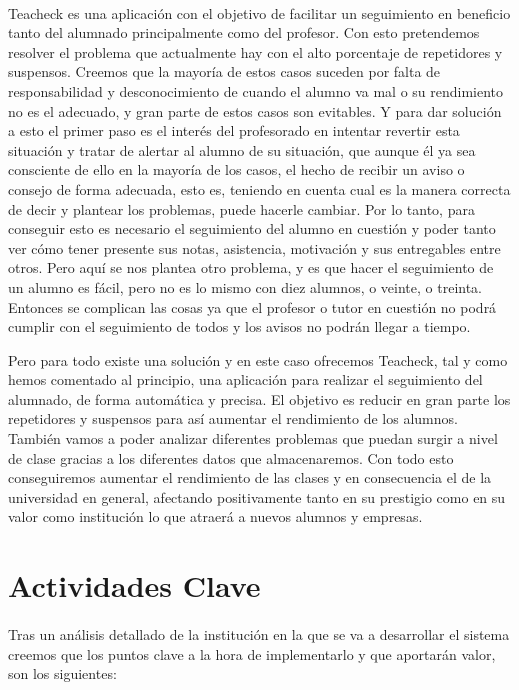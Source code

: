 \paragraph{}
Teacheck es una aplicación con el objetivo de facilitar un seguimiento
en beneficio tanto del alumnado principalmente como del profesor. Con
esto pretendemos resolver el problema que actualmente hay con el alto
porcentaje de repetidores y suspensos. Creemos que la mayoría de estos
casos suceden por falta de responsabilidad y desconocimiento de cuando
el alumno va mal o su rendimiento no es el adecuado, y gran parte de
estos casos son evitables. Y para dar solución a esto el primer paso
es el interés del profesorado en intentar revertir esta situación y
tratar de alertar al alumno de su situación, que aunque él ya sea
consciente de ello en la mayoría de los casos, el hecho de recibir un
aviso o consejo de forma adecuada, esto es, teniendo en cuenta cual es
la manera correcta de decir y plantear los problemas, puede hacerle
cambiar. Por lo tanto, para conseguir esto es necesario el seguimiento
del alumno en cuestión y poder tanto ver cómo tener presente sus
notas, asistencia, motivación y sus entregables entre otros. Pero aquí
se nos plantea otro problema, y es que hacer el seguimiento de un
alumno es fácil, pero no es lo mismo con diez alumnos, o veinte, o
treinta. Entonces se complican las cosas ya que el profesor o tutor en
cuestión no podrá cumplir con el seguimiento de todos y los avisos no
podrán llegar a tiempo.

Pero para todo existe una solución y en este caso ofrecemos Teacheck,
tal y como hemos comentado al principio, una aplicación para realizar
el seguimiento del alumnado, de forma automática y precisa. El
objetivo es reducir en gran parte los repetidores y suspensos para así
aumentar el rendimiento de los alumnos. También vamos a poder analizar
diferentes problemas que puedan surgir a nivel de clase gracias a los
diferentes datos que almacenaremos. Con todo esto conseguiremos
aumentar el rendimiento de las clases y en consecuencia el de la
universidad en general, afectando positivamente tanto en su prestigio
como en su valor como institución lo que atraerá a nuevos alumnos y
empresas.

\section{Actividades Clave}

\paragraph{}
Tras un análisis detallado de la institución en la que se va a
desarrollar el sistema creemos que los puntos clave a la hora de
implementarlo y que aportarán valor, son los siguientes:

